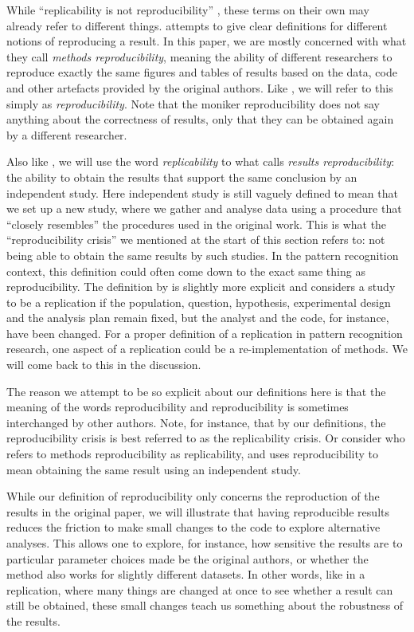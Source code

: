 \documentclass[twoside]{memoir}\usepackage[]{graphicx}\usepackage{xcolor}
\begin{document}
While ``replicability is not reproducibility'' \citep{Drummond2009}, these terms on their own may already refer to different things. \citet{Goodman2016a} attempts to give clear definitions for different notions of reproducing a result. In this paper, we are mostly concerned with what they call \emph{methods reproducibility}, meaning the ability of different researchers to reproduce exactly the same figures and tables of results based on the data, code and other artefacts provided by the original authors. Like \citet{Patil2016}, we will refer to this simply as \emph{reproducibility}. Note that the moniker reproducibility does not say anything about the correctness of results, only that they can be obtained again by a different researcher.

Also like \citet{Patil2016}, we will use the word \emph{replicability} to what \citet{Goodman2016a} calls \emph{results reproducibility}: the ability to obtain the results that support the same conclusion by an independent study. Here independent study is still vaguely defined to mean that we set up a new study, where we gather and analyse data using a procedure that ``closely resembles'' the procedures used in the original work.  This is what the ``reproducibility crisis'' we mentioned at the start of this section refers to: not being able to obtain the same results by such studies. In the pattern recognition context, this definition could often come down to the exact same thing as reproducibility. The definition by \citet{Patil2016} is slightly more explicit and considers a study to be a replication if the population, question, hypothesis, experimental design and the analysis plan remain fixed, but the analyst and the code, for instance, have been changed. For a proper definition of a replication in pattern recognition research, one aspect of a replication could be a re-implementation of methods. We will come back to this in the discussion.

The reason we attempt to be so explicit about our definitions here is that the meaning of the words reproducibility and reproducibility is sometimes interchanged by other authors. Note, for instance, that by our definitions, the reproducibility crisis is best referred to as the replicability crisis. Or consider \citet{Drummond2009} who refers to methods reproducibility as replicability, and uses reproducibility to mean obtaining the same result using an independent study. 

While our definition of reproducibility only concerns the reproduction of the results in the original paper, we will illustrate that having reproducible results reduces the friction to make small changes to the code to explore alternative analyses. This allows one to explore, for instance, how sensitive the results are to particular parameter choices made be the original authors, or whether the method also works for slightly different datasets. In other words, like in a replication, where many things are changed at once to see whether a result can still be obtained, these small changes teach us something about the robustness of the results.
\end{document}
